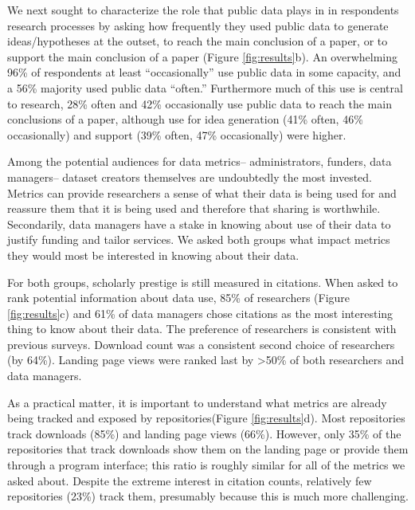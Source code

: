\documentclass[english]{article}
\begin{document}
We next sought to characterize the role that public data plays in in respondents research processes by asking how frequently they used public data to generate ideas/hypotheses at the outset, to reach the main conclusion of a paper, or to support the main conclusion of a paper (Figure \ref{fig:results}b).
An overwhelming 96\% of respondents at least ``occasionally'' use public data in some capacity, and a 56\% majority used public data ``often.''
Furthermore much of this use is central to research, 28\% often and 42\% occasionally use public data to reach the main conclusions of a paper, although use for idea generation (41\% often, 46\% occasionally) and support (39\% often, 47\% occasionally) were higher.



Among the potential audiences for data metrics-- administrators, funders, data managers-- dataset creators themselves are undoubtedly the most invested.
Metrics can provide researchers a sense of what their data is being used for and reassure them that it is being used and therefore that sharing is worthwhile.
Secondarily, data managers have a stake in knowing about use of their data to justify funding and tailor services.
We asked both groups what impact metrics they would most be interested in knowing about their data. 

For both groups, scholarly prestige is still measured in citations.
When asked to rank potential information about data use, 85\% of researchers (Figure \ref{fig:results}c) and 61\% of data managers chose citations as the most interesting thing to know about their data. 
The preference of researchers is consistent with previous surveys\cite{kratz_researcher_2015}.
Download count was a consistent second choice of researchers (by 64\%). 
Landing page views were ranked last by >50\% of both researchers and data managers.

As a practical matter, it is important to understand what metrics are already being tracked and exposed by repositories(Figure \ref{fig:results}d). 
Most repositories track downloads (85\%) and landing page views (66\%). 
However, only 35\% of the repositories that track downloads show them on the landing page or provide them through a program interface; this ratio is roughly similar for all of the metrics we asked about. 
Despite the extreme interest in citation counts, relatively few repositories (23\%) track them, presumably because this is much more challenging. 
\end{document}
